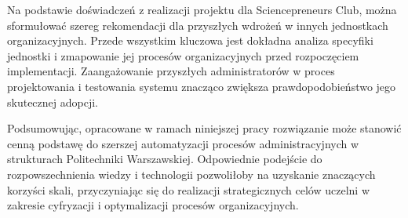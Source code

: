 Na podstawie doświadczeń z realizacji projektu dla Sciencepreneurs Club, można sformułować szereg rekomendacji dla przyszłych wdrożeń w innych jednostkach organizacyjnych. Przede wszystkim kluczowa jest dokładna analiza specyfiki jednostki i zmapowanie jej procesów organizacyjnych przed rozpoczęciem implementacji. Zaangażowanie przyszłych administratorów w proces projektowania i testowania systemu znacząco zwiększa prawdopodobieństwo jego skutecznej adopcji. 

Podsumowując, opracowane w ramach niniejszej pracy rozwiązanie może stanowić cenną podstawę do szerszej automatyzacji procesów administracyjnych w strukturach Politechniki Warszawskiej. Odpowiednie podejście do rozpowszechnienia wiedzy i technologii pozwoliłoby na uzyskanie znaczących korzyści skali, przyczyniając się do realizacji strategicznych celów uczelni w zakresie cyfryzacji i optymalizacji procesów organizacyjnych.